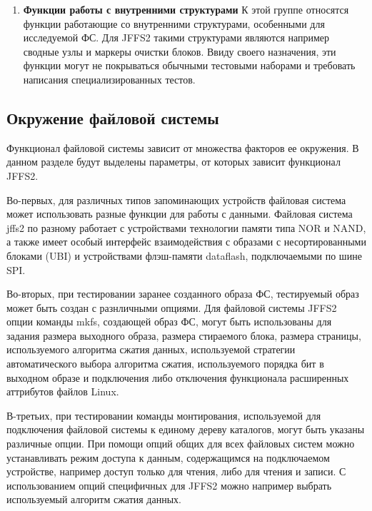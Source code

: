 \begin{enumerate}
	\item \textbf{Функции работы с внутренними структурами}
	К этой группе относятся функции работающие со внутренними структурами, особенными для исследуемой ФС. Для JFFS2 такими структурами являются например сводные узлы и маркеры очистки блоков. Ввиду своего назначения, эти функции могут не покрываться обычными тестовыми наборами и требовать написания специализированных тестов.
\end{enumerate}

\subsection{Окружение файловой системы}

Функционал файловой системы зависит от множества факторов ее окружения. В данном разделе будут выделены параметры, от которых зависит функционал JFFS2.

Во-первых, для различных типов запоминающих устройств файловая система может использовать разные функции для работы с данными. Файловая система jffs2 по разному работает с устройствами технологии памяти типа NOR и NAND, а также имеет особый интерфейс взаимодействия с образами с несортированными блоками (UBI) и устройствами флэш-памяти dataflash, подключаемыми по шине SPI. 

Во-вторых, при тестировании заранее созданного образа ФС, тестируемый образ может быть создан с разнличными опциями. Для файловой системы JFFS2 опции команды mkfs, создающей образ ФС, могут быть использованы для задания размера выходного образа, размера стираемого блока, размера страницы, используемого алгоритма сжатия данных, используемой стратегии автоматического выбора алгоритма сжатия, используемого порядка бит в выходном образе и подключения либо отключения функционала расширенных аттрибутов файлов Linux. 

В-третьих, при тестировании команды монтирования, используемой для подключения файловой системы к единому дереву каталогов, могут быть указаны различные опции. При помощи опций общих для всех файловых систем можно устанавливать режим доступа к данным, содержащимся на подключаемом устройстве, например доступ только для чтения, либо для чтения и записи. С использованием опций специфичных для JFFS2 можно например выбрать используемый алгоритм сжатия данных.

